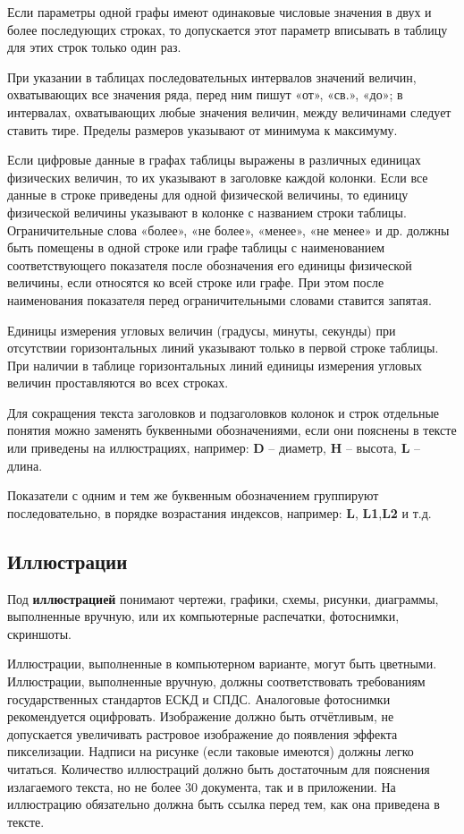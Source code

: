 Если параметры одной графы имеют одинаковые числовые значения в двух и более
последующих строках, то допускается этот параметр вписывать в таблицу для этих строк только
один раз.

При указании в таблицах последовательных интервалов значений величин,
охватывающих все значения ряда, перед ним пишут «от», «св.», «до»; в интервалах,
охватывающих любые значения величин, между величинами следует ставить тире. Пределы
размеров указывают от минимума к максимуму.

Если цифровые данные в графах таблицы выражены в различных единицах физических
величин, то их указывают в заголовке каждой колонки. Если все данные в строке приведены для
одной физической величины, то единицу физической величины указывают в колонке с
названием строки таблицы. Ограничительные слова «более», «не более», «менее», «не менее» и
др. должны быть помещены в одной строке или графе таблицы с наименованием
соответствующего показателя после обозначения его единицы физической величины, если
относятся ко всей строке или графе. При этом после наименования показателя перед
ограничительными словами ставится запятая.

Единицы измерения угловых величин (градусы, минуты, секунды) при отсутствии
горизонтальных линий указывают только в первой строке таблицы. При наличии в таблице
горизонтальных линий единицы измерения угловых величин проставляются во всех строках.

Для сокращения текста заголовков и подзаголовков колонок и строк отдельные понятия
можно заменять буквенными обозначениями, если они пояснены в тексте или приведены на
иллюстрациях, например: {\bf D} -- диаметр, {\bf H} --  высота, {\bf L} -- длина.

Показатели с одним и тем же буквенным обозначением группируют последовательно, в
порядке возрастания индексов, например: {\bf L}, {\bf L1},{\bf L2} и т.д.

\subsection{Иллюстрации}
Под {\bf иллюстрацией} понимают чертежи, графики, схемы, рисунки, диаграммы, выполненные
вручную, или их компьютерные распечатки, фотоснимки, скриншоты.

Иллюстрации, выполненные в компьютерном варианте, могут быть цветными. Иллюстрации, 
выполненные вручную, должны соответствовать требованиям государственных стандартов
ЕСКД и СПДС. Аналоговые фотоснимки рекомендуется оцифровать. Изображение должно 
быть отчётливым, не допускается увеличивать растровое изображение до появления
эффекта пикселизации. Надписи на рисунке (если таковые имеются) должны легко читаться.
Количество иллюстраций должно быть достаточным для пояснения излагаемого текста,
но не более 30%
документа, так и в приложении. На иллюстрацию обязательно должна быть ссылка перед тем,
как она приведена в тексте.

